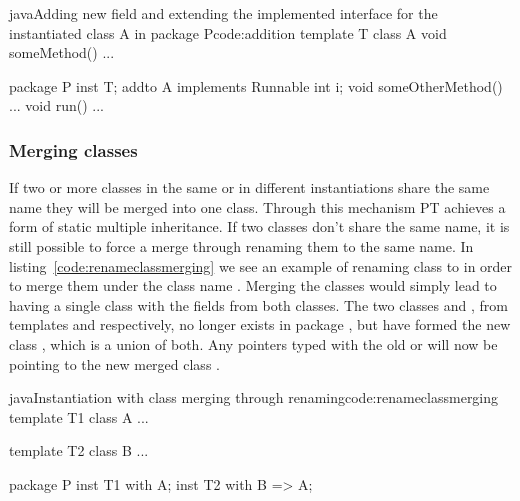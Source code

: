 \begin{code}{java}{Adding new field and extending the implemented interface for the instantiated class A in package P}{code:addition}
template T {
    class A {
        void someMethod() { ... }
    }
}

package P {
    inst T;
    addto A implements Runnable {
        int i;
        void someOtherMethod() { ... }
        void run() { ... }
    }
}
\end{code}


\subsubsection{Merging classes}\label{subsubsec:merging-classes}

If two or more classes in the same or in different instantiations share the same name they will be merged into one class.
Through this mechanism PT achieves a form of static multiple inheritance.
If two classes don't share the same name, it is still possible to force a merge through renaming them to the same name.
In listing~\vref{code:renameclassmerging} we see an example of renaming class  to  in order to merge them under the class name .
Merging the classes would simply lead to having a single class  with the fields from both classes.
The two classes  and , from templates  and  respectively, no longer exists in package , but have formed the new class , which is a union of both.
Any pointers typed with the old  or  will now be pointing to the new merged class .

\begin{code}{java}{Instantiation with class merging through renaming}{code:renameclassmerging}
template T1 {
    class A {
        ...
    }
}

template T2 {
    class B {
        ...
    }
}

package P {
    inst T1 with A;
    inst T2 with B => A;
}
\end{code}

